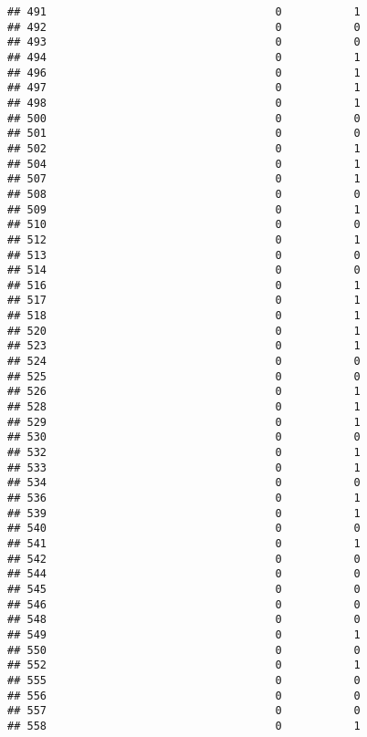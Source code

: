 \documentclass[
]{article}
\begin{document}
\begin{verbatim}
## 491                                   0           1
## 492                                   0           0
## 493                                   0           0
## 494                                   0           1
## 496                                   0           1
## 497                                   0           1
## 498                                   0           1
## 500                                   0           0
## 501                                   0           0
## 502                                   0           1
## 504                                   0           1
## 507                                   0           1
## 508                                   0           0
## 509                                   0           1
## 510                                   0           0
## 512                                   0           1
## 513                                   0           0
## 514                                   0           0
## 516                                   0           1
## 517                                   0           1
## 518                                   0           1
## 520                                   0           1
## 523                                   0           1
## 524                                   0           0
## 525                                   0           0
## 526                                   0           1
## 528                                   0           1
## 529                                   0           1
## 530                                   0           0
## 532                                   0           1
## 533                                   0           1
## 534                                   0           0
## 536                                   0           1
## 539                                   0           1
## 540                                   0           0
## 541                                   0           1
## 542                                   0           0
## 544                                   0           0
## 545                                   0           0
## 546                                   0           0
## 548                                   0           0
## 549                                   0           1
## 550                                   0           0
## 552                                   0           1
## 555                                   0           0
## 556                                   0           0
## 557                                   0           0
## 558                                   0           1

\end{verbatim}
\end{document}
